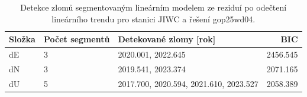 \begin{table}[htbp]
\caption{Detekce zlomů segmentovaným lineárním modelem ze reziduí po odečtení lineárního trendu pro stanici JIWC a řešení gop25wd04.}
\label{tab:gop25wd04_stcd_jiwc_detr_weighted_1seg_jumps_piecewise_bic}
\begin{tabular}{lllr}
\toprule
Složka & Počet segmentů & Detekované zlomy [rok] & BIC \\
\midrule
dE & 3 & 2020.001, 2022.645 & 2456.545 \\
dN & 3 & 2019.541, 2023.374 & 2071.165 \\
dU & 5 & 2017.700, 2020.594, 2021.610, 2023.527 & 2058.389 \\
\bottomrule
\end{tabular}
\end{table}
